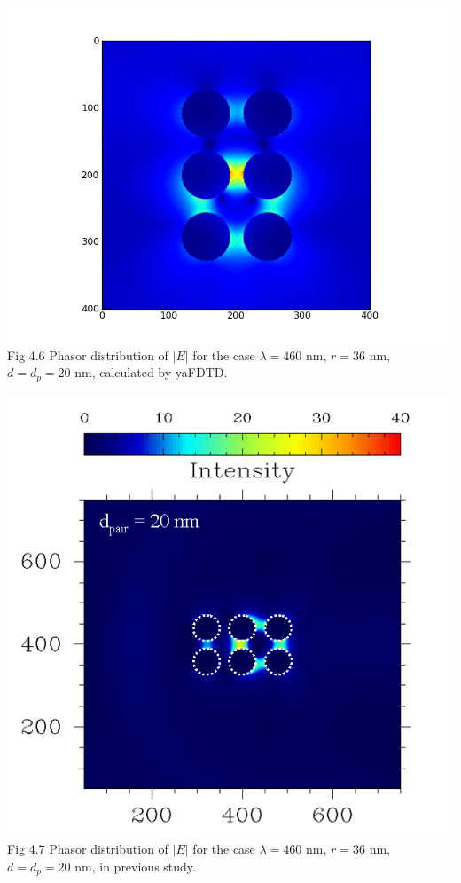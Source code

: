 \documentclass[openany]{book}
\begin{document}
\begin{center}
\includegraphics[scale=0.8]{images/etotal.png}\\
Fig 4.6
Phasor distribution of $|E|$ for the case $\lambda = 460$ nm, $r = 36$ nm, $d = d_p = 20$ nm, calculated by yaFDTD.
\end{center}
\begin{center}
\includegraphics[scale=0.5]{images/r36.png}\\
Fig 4.7
Phasor distribution of $|E|$ for the case $\lambda = 460$ nm, $r = 36$ nm, $d = d_p = 20$ nm, in previous study.
\end{center}
\end{document}
